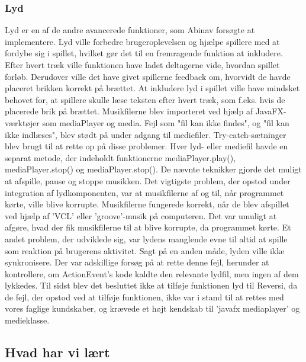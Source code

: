 \subsubsection{Lyd}\label{lyd}
Lyd er en af de andre avancerede funktioner, som Abinav forsøgte at implementere. Lyd ville forbedre brugeroplevelsen og hjælpe spillere med at fordybe sig i spillet, hvilket gør det til en fremragende funktion at inkludere. Efter hvert træk ville funktionen have ladet deltagerne vide, hvordan spillet forløb. Derudover ville det have givet spillerne feedback om, hvorvidt de havde placeret brikken korrekt på brættet. At inkludere lyd i spillet ville have mindsket behovet for, at spillere skulle læse teksten efter hvert træk, som f.eks. hvis de placerede brik på brættet.
Musikfilerne blev importeret ved hjælp af JavaFX-værktøjer som mediaPlayer og media. Fejl som "fil kan ikke findes", og "fil kan ikke indlæses", blev stødt på under adgang til mediefiler. Try-catch-sætninger blev brugt til at rette op på disse problemer. Hver lyd- eller mediefil havde en separat metode, der indeholdt funktionerne mediaPlayer.play(), mediaPlayer.stop() og mediaPlayer.stop(). De nævnte teknikker gjorde det muligt at afspille, pause og stoppe musikken. Det vigtigste problem, der opstod under integration af lydkomponenten, var at musikfilerne af og til, når programmet kørte, ville blive korrupte. Musikfilerne fungerede korrekt, når de blev afspillet ved hjælp af 'VCL' eller 'groove'-musik på computeren. Det var umuligt at afgøre, hvad der fik musikfilerne til at blive korrupte, da programmet kørte. Et andet problem, der udviklede sig, var lydens manglende evne til altid at spille som reaktion på brugerens aktivitet. Sagt på en anden måde, lyden ville ikke synkronisere. Der var adskillige forsøg på at rette denne fejl, herunder at kontrollere, om ActionEvent's kode kaldte den relevante lydfil, men ingen af dem lykkedes. Til sidst blev det besluttet ikke at tilføje funktionen lyd til Reversi, da de fejl, der opstod ved at tilføje funktionen, ikke var i stand til at rettes med vores faglige kundskaber, og krævede et højt kendskab til 'javafx mediaplayer' og medieklasse.


\subsection{Hvad har vi lært}
